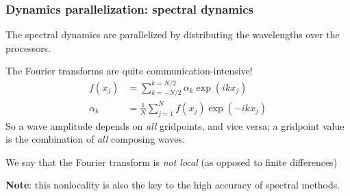 \documentclass[aspectratio=43,9pt]{beamer}
\begin{document}
%
%
\begin{frame}
	\frametitle{Dynamics parallelization: spectral dynamics}
	\begin{myitemize}{2ex}
		\item The spectral dynamics are parallelized by distributing the wavelengths over the processors.
		\item The Fourier transforms are quite communication-intensive!
			\begin{align*}
				f(x_j)		&=\sum_{k=-N/2}^{k=N/2} \alpha_k \exp(i k x_j)	\\
				\alpha_k	&=\frac{1}{N}\sum_{j=1}^N f(x_j) \exp(- i k x_j)
			\end{align*}
			So a wave amplitude depends on \emph{all} gridpoints, and vice versa; a gridpoint value is the combination of \emph{all} composing waves.
		\item We say that the Fourier transform is \emph{not local} (as opposed to finite differences)
		\item \textbf{Note}: this nonlocality is also the key to the high accuracy of spectral methods.
	\end{myitemize}
\end{frame}
%
%
\end{document}
